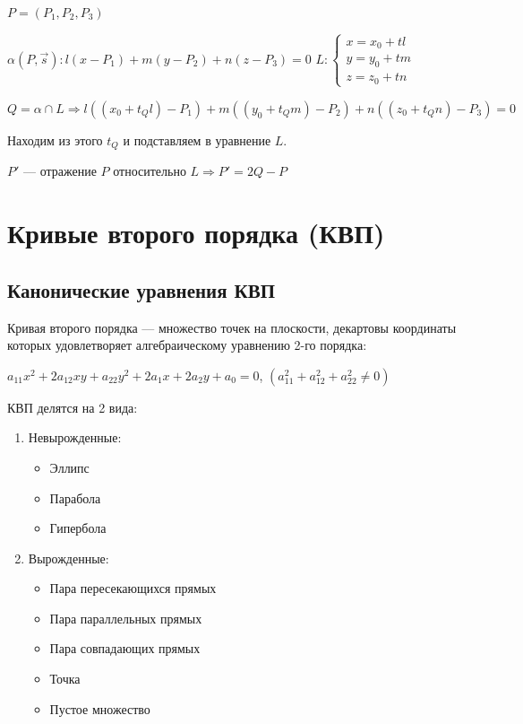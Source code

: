 \documentclass[twoside]{book}
\begin{document}
\(P = (P_1, P_2, P_3)\)

\(\alpha(P, \vec s): l(x - P_1) + m(y - P_2) + n(z - P_3) = 0\)
\(L:
\begin{cases}
    x = x_0 + t l \\
    y = y_0 + t m \\
    z = z_0 + t n
\end{cases}\)

\(Q = \alpha \cap L \Rightarrow l((x_0 + t_Q l) - P_1) + m((y_0 + t_Q m) - P_2) + n((z_0 + t_Q n) - P_3) = 0\)

Находим из этого \(t_Q\) и подставляем в уравнение \(L\).

\(P'\) --- отражение \(P\) относительно \(L \Rightarrow P' = 2Q - P\)


\section{Кривые второго порядка (КВП)}
\subsection{Канонические уравнения КВП}
Кривая второго порядка --- множество точек на плоскости, декартовы координаты которых удовлетворяет алгебраическому уравнению 2-го порядка:

\(a_{11} x^2 + 2 a_{12} xy + a_{22} y^2 + 2 a_1 x + 2 a_2 y + a_0 = 0\), \((a_{11}^2 + a_{12}^2 + a_{22}^2 \neq 0)\)

КВП делятся на 2 вида:
\begin{enumerate}
    \item Невырожденные:
          \begin{itemize}
              \item Эллипс
              \item Парабола
              \item Гипербола
          \end{itemize}
    \item Вырожденные:
          \begin{itemize}
              \item Пара пересекающихся прямых
              \item Пара параллельных прямых
              \item Пара совпадающих прямых
              \item Точка
              \item Пустое множество
          \end{itemize}
\end{enumerate}
\end{document}
